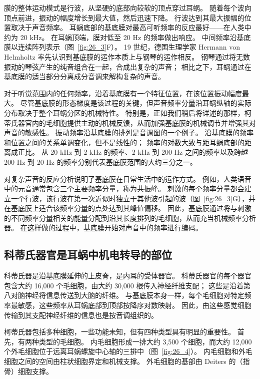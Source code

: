 膜的整体运动模式是行波，从坚硬的底部向较软的顶点穿过耳蜗。
随着每个波向顶点前进，振动的幅度增长到最大值，然后迅速下降。
行波达到其最大振幅的位置取决于声音频率。
耳蜗底部的基底膜对最高可听频率的反应最好——在人类中约为 20 kHz。
在耳蜗顶端，膜对低至 20 Hz 的频率做出响应。
中间频率沿基底膜以连续阵列表示（图~\ref{fig:26_3}F）。
19 世纪，德国生理学家 Hermann von Helmholtz 率先认识到基底膜的运作本质上与钢琴的运作相反。
钢琴通过将无数振动的琴弦产生的纯音组合在一起，合成出复杂的声音；
相比之下，耳蜗通过在基底膜的适当部分分离成分音调来解构复杂的声音。


对于听觉范围内的任何频率，沿着基底膜有一个特征位置，在该位置振动幅度最大。
尽管基底膜的形态梯度是该过程的关键，但声音频率分量沿耳蜗纵轴的实际分布取决于整个耳蜗分区的机械特性。
特别是，正如我们稍后将详述的那样，柯蒂氏器官内的毛细胞提供主动的机械反馈，从而加强基底膜的机械调节并增强其对声音的敏感性。
振动频率沿基底膜的排列是音调图的一个例子。
沿基底膜的频率和位置之间的关系单调变化，但不是线性的； 频率的对数大致与距耳蜗底部的距离成正比。
从 20 kHz 到 2 kHz 的频率、2 kHz 到 200 Hz 之间的频率以及跨越 200 Hz 到 20 Hz 的频率分别代表基底膜范围的大约三分之一。


对复杂声音的反应分析说明了基底膜在日常生活中的运作方式。
例如，人类语音中的元音通常包含三个主要频率分量，称为共振峰。
刺激的每个频率分量都会建立一个行波，该行波在第一次近似时独立于其他波引起的波（图~\ref{fig:26_3}G），并在基底膜上适合该频率分量的点处达到其峰值偏移。
因此，基底膜通过将与刺激的不同频率分量相关的能量分配到沿其长度排列的毛细胞，从而充当机械频率分析器。
在这样做的过程中，基底膜开始对声音中的频率进行编码。



\subsection{科蒂氏器官是耳蜗中机电转导的部位}

科蒂氏器是沿基底膜延伸的上皮脊，是内耳的受体器官。
科蒂氏器官的每个器官包含大约 16,000 个毛细胞，由大约 30,000 根传入神经纤维支配；
这些是沿着第八对脑神经将信息传送到大脑的纤维。
与基底膜本身一样，每个毛细胞对特定频率最敏感，这些频率从耳蜗底部到顶部按降序对数映射。
因此，由这些感觉细胞传输到其支配神经纤维的信息也是按音调组织的。


柯蒂氏器包括多种细胞，一些功能未知，但有四种类型具有明显的重要性。
首先，有两种类型的毛细胞。
内毛细胞形成一排大约 3,500 个细胞，而大约 12,000 个外毛细胞位于远离耳蜗螺旋中心轴的三排中（图~\ref{fig:26_4}）。
内毛细胞和外毛细胞之间的空间由柱状细胞界定和机械支撑。
外毛细胞的基部由 Deiters 的（指骨）细胞支撑。



